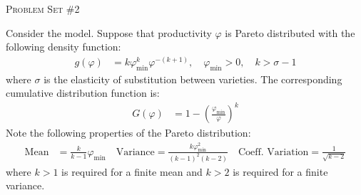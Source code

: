 \documentclass[12pt,answers]{exam}
\begin{document}
\begin{center}\LARGE \textsc{Problem Set \#2} \end{center}
Consider the \cite{melitz2003Econometrica} model. Suppose that productivity $\varphi$ is Pareto distributed with the following
density function:
\begin{align*}
g(\varphi) &= k \varphi_{\min}^k \varphi^{-(k+1)}, \quad \varphi_{\min} > 0, \quad k > \sigma - 1
\end{align*}
where $\sigma$ is the elasticity of substitution between varieties. The corresponding cumulative distribution
function is:
\begin{align*}
G(\varphi) &= 1 - \left( \frac{\varphi_{\min}}{\varphi} \right)^k
\end{align*}
Note the following properties of the Pareto distribution:
\begin{align*}
\text{Mean} &= \frac{k}{k-1} \varphi_{\min} \quad \text{Variance} = \frac{k \varphi_{\min}^2}{(k-1)^2 (k-2)} \quad \text{Coeff. Variation} = \frac{1}{\sqrt{k-2}}
\end{align*}
where $k > 1$ is required for a finite mean and $k > 2$ is required for a finite variance.
\begin{questions}
    \question
    
    \newpage
    \question
    
    \newpage
\end{questions}

\newpage


\end{document}

